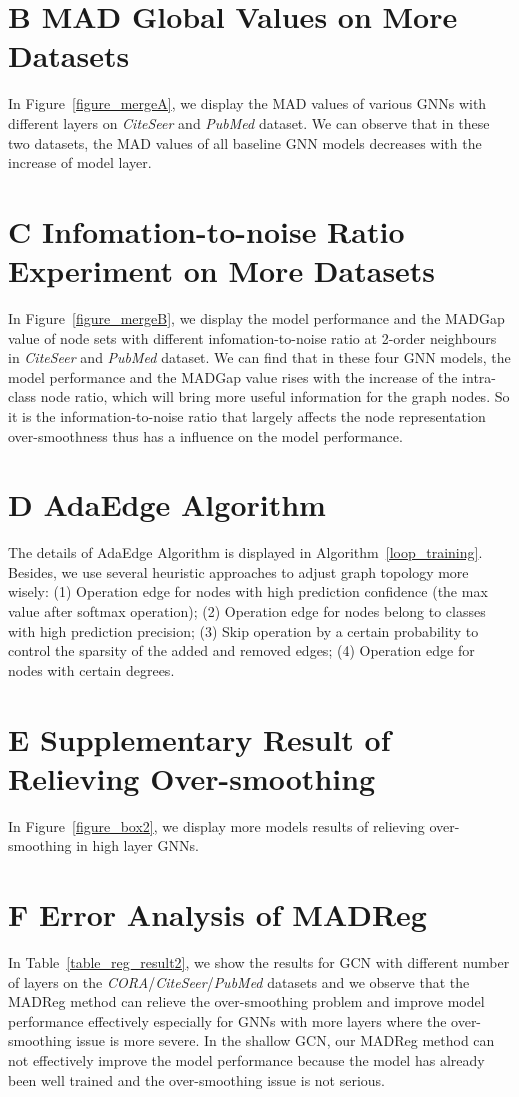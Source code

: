 \documentclass[letterpaper]{article} \usepackage{aaai20}  \usepackage{times}  \usepackage{helvet} \usepackage{courier}  \usepackage[hyphens]{url}  \usepackage{graphicx} \urlstyle{rm} \def\UrlFont{\rm}  \frenchspacing  \setlength{\pdfpagewidth}{8.5in}  \setlength{\pdfpageheight}{11in}  \setcounter{secnumdepth}{0}
\begin{document}
\section{B MAD Global Values on More Datasets }
In Figure~\ref{figure_mergeA}, we display the MAD values of various GNNs with different layers on \textit{CiteSeer} and \textit{PubMed} dataset. We can observe that in these two datasets, the MAD values of all baseline GNN models decreases with the increase of model layer.

\section{C Infomation-to-noise Ratio Experiment on More Datasets }
In Figure~\ref{figure_mergeB}, we display the model performance and the MADGap value of node sets with different infomation-to-noise ratio at 2-order neighbours in \textit{CiteSeer} and \textit{PubMed} dataset. We can find that in these four GNN models, the model performance and the MADGap value rises
with the increase of the intra-class node ratio, which will bring more useful information for the graph nodes. So it is the information-to-noise ratio that largely affects the node representation over-smoothness thus has a influence on the model performance.

\section{D AdaEdge Algorithm}
The details of AdaEdge Algorithm is displayed in Algorithm~\ref{loop_training}.
Besides, we use several heuristic approaches to adjust graph topology more wisely: (1) Operation edge for nodes with high prediction confidence (the max value after softmax operation); (2) Operation edge for nodes belong to classes with high prediction precision; (3) Skip operation by a certain probability to control the sparsity of the added and removed edges; (4) Operation edge for nodes with certain degrees.

\section{E Supplementary Result of Relieving Over-smoothing}
In Figure~\ref{figure_box2}, we display more models results of relieving over-smoothing in high layer GNNs. 

\section{F Error Analysis of MADReg}
In Table~\ref{table_reg_result2}, we show the results for GCN with different number of layers on the \textit{CORA}/\textit{CiteSeer}/\textit{PubMed} datasets and we observe that the MADReg method can relieve the over-smoothing problem and improve model performance effectively especially for GNNs with more layers where the over-smoothing issue is more severe.
In the shallow GCN, our MADReg method can not effectively improve the model performance because the model has already been well trained and the over-smoothing issue is not serious.
\end{document}
